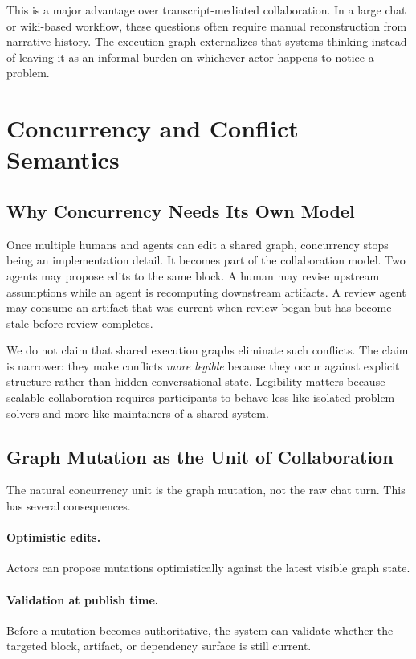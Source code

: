 \documentclass{article}
\begin{document}
This is a major advantage over transcript-mediated collaboration. In a large chat or wiki-based workflow, these questions often require manual reconstruction from narrative history. The execution graph externalizes that systems thinking instead of leaving it as an informal burden on whichever actor happens to notice a problem.

\section{Concurrency and Conflict Semantics}

\subsection{Why Concurrency Needs Its Own Model}

Once multiple humans and agents can edit a shared graph, concurrency stops being an implementation detail. It becomes part of the collaboration model. Two agents may propose edits to the same block. A human may revise upstream assumptions while an agent is recomputing downstream artifacts. A review agent may consume an artifact that was current when review began but has become stale before review completes.

We do not claim that shared execution graphs eliminate such conflicts. The claim is narrower: they make conflicts \emph{more legible} because they occur against explicit structure rather than hidden conversational state. Legibility matters because scalable collaboration requires participants to behave less like isolated problem-solvers and more like maintainers of a shared system.

\subsection{Graph Mutation as the Unit of Collaboration}

The natural concurrency unit is the graph mutation, not the raw chat turn. This has several consequences.

\paragraph{Optimistic edits.}
Actors can propose mutations optimistically against the latest visible graph state.

\paragraph{Validation at publish time.}
Before a mutation becomes authoritative, the system can validate whether the targeted block, artifact, or dependency surface is still current.
\end{document}
